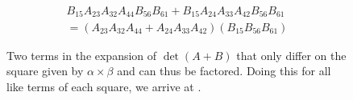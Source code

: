 \documentclass[conference]{IEEEtran}
\begin{document}
\begin{figure}[t]
	\begin{center}
		
	\end{center}
	\vspace{-2mm}
	{\color{captioncolor}
		\begin{align*}
		B_{15}A_{23}A_{32}A_{44}B_{56}B_{61} + B_{15}A_{24}A_{33}A_{42}B_{56}B_{61}\\
        = (A_{23}A_{32}A_{44}+A_{24}A_{33}A_{42})(B_{15}B_{56}B_{61})
		\end{align*}}
	\vspace{-5mm}
	\caption{Two terms in the expansion of $\det(A+B)$ that only differ on the square given by $\alpha\times\beta$ and can thus be factored. Doing this for all like terms of each square, we arrive at .}
	\label{fig:det-sum}
\end{figure}
\end{document}
